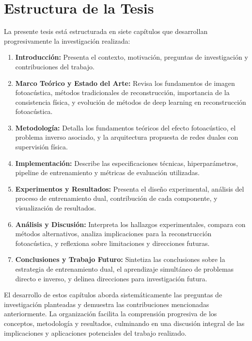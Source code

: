 \section{Estructura de la Tesis}
\label{sec}
La presente tesis está estructurada en siete capítulos que desarrollan progresivamente la investigación realizada:
\begin{enumerate}
\item \textbf{Introducción:} Presenta el contexto, motivación, preguntas de investigación y contribuciones del trabajo.
\item \textbf{Marco Teórico y Estado del Arte:} Revisa los fundamentos de imagen fotoacústica, métodos tradicionales de reconstrucción, importancia de la consistencia física, y evolución de métodos de deep learning en reconstrucción fotoacústica.
\item \textbf{Metodología:} Detalla los fundamentos teóricos del efecto fotoacústico, el problema inverso asociado, y la arquitectura propuesta de redes duales con supervisión física.
\item \textbf{Implementación:} Describe las especificaciones técnicas, hiperparámetros, pipeline de entrenamiento y métricas de evaluación utilizadas.
\item \textbf{Experimentos y Resultados:} Presenta el diseño experimental, análisis del proceso de entrenamiento dual, contribución de cada componente, y visualización de resultados.
\item \textbf{Análisis y Discusión:} Interpreta los hallazgos experimentales, compara con métodos alternativos, analiza implicaciones para la reconstrucción fotoacústica, y reflexiona sobre limitaciones y direcciones futuras.
\item \textbf{Conclusiones y Trabajo Futuro:} Sintetiza las conclusiones sobre la estrategia de entrenamiento dual, el aprendizaje simultáneo de problemas directo e inverso, y delinea direcciones para investigación futura.
\end{enumerate}
El desarrollo de estos capítulos aborda sistemáticamente las preguntas de investigación planteadas y demuestra las contribuciones mencionadas anteriormente. La organización facilita la comprensión progresiva de los conceptos, metodología y resultados, culminando en una discusión integral de las implicaciones y aplicaciones potenciales del trabajo realizado.